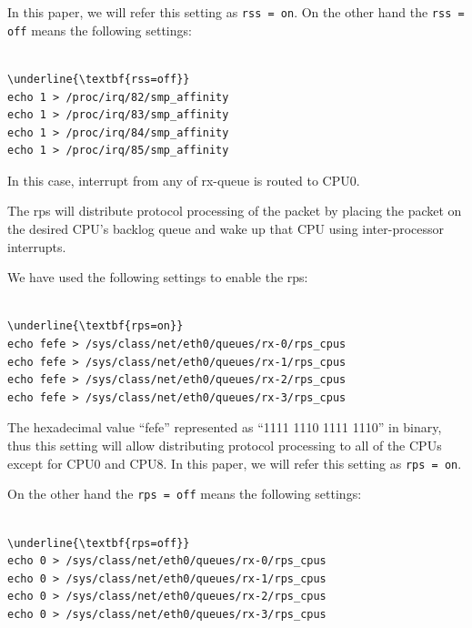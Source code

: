 In this paper, we will refer this setting as {\tt rss = on}.
On the other hand the {\tt rss = off} means the following settings:

\begin{center}
\begin{minipage}{0.8\columnwidth}
\begin{Verbatim}[commandchars=\\\{\}]

\underline{\textbf{rss=off}}
echo 1 > /proc/irq/82/smp_affinity
echo 1 > /proc/irq/83/smp_affinity
echo 1 > /proc/irq/84/smp_affinity
echo 1 > /proc/irq/85/smp_affinity

\end{Verbatim}
\end{minipage}
\end{center}

In this case, interrupt from any of rx-queue is routed to CPU0.

The rps will distribute protocol processing of the packet by placing the packet
on the desired CPU's backlog queue and wake up that CPU using inter-processor interrupts.

We have used the following settings to enable the rps:

\begin{center}
\begin{minipage}{0.8\columnwidth}
\begin{Verbatim}[commandchars=\\\{\}]

\underline{\textbf{rps=on}}
echo fefe > /sys/class/net/eth0/queues/rx-0/rps_cpus
echo fefe > /sys/class/net/eth0/queues/rx-1/rps_cpus
echo fefe > /sys/class/net/eth0/queues/rx-2/rps_cpus
echo fefe > /sys/class/net/eth0/queues/rx-3/rps_cpus

\end{Verbatim}
\end{minipage}
\end{center}

The hexadecimal value \enquote{fefe} represented as \enquote{1111 1110 1111 1110} in binary, 
thus this setting will allow distributing protocol processing to all of the CPUs except for CPU0 and CPU8.
In this paper, we will refer this setting as {\tt rps = on}.

On the other hand the {\tt rps = off} means the following settings:

\begin{center}
\begin{minipage}{0.8\columnwidth}
\begin{Verbatim}[commandchars=\\\{\}]

\underline{\textbf{rps=off}}
echo 0 > /sys/class/net/eth0/queues/rx-0/rps_cpus
echo 0 > /sys/class/net/eth0/queues/rx-1/rps_cpus
echo 0 > /sys/class/net/eth0/queues/rx-2/rps_cpus
echo 0 > /sys/class/net/eth0/queues/rx-3/rps_cpus

\end{Verbatim}
\end{minipage}
\end{center}

